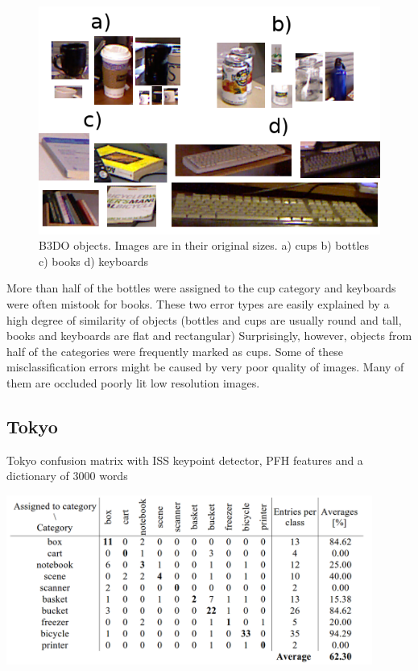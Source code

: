 	\begin{figure}[!ht]
	\centering	
	\includegraphics[width=.75\textwidth]{figs/b3do_objects}
	\caption{B3DO objects. Images are in their original sizes. a) cups b) bottles c) books d) keyboards}
	\label{fig:b3do_objects}
	\end{figure}
	
	More than half of the bottles were assigned to the cup category and keyboards were often mistook for books. These two error types are easily explained by a high degree of similarity of objects (bottles and cups are usually round and tall, books and keyboards are flat and rectangular) Surprisingly, however, objects from half of the categories were frequently marked as cups. Some of these misclassification errors might be caused by very poor quality of images. Many of them are occluded poorly lit low resolution images.	
	
	\subsection{Tokyo}
	\begin{table}[!ht]
	\centering
	\caption{Tokyo confusion matrix with ISS keypoint detector, PFH features and a dictionary of 3000 words}
	\includegraphics[width=0.9\textwidth]{figs/tokyo_conf_matrix}	
	\label{tab:tokyo_conf_matrix}
	\end{table}
	
